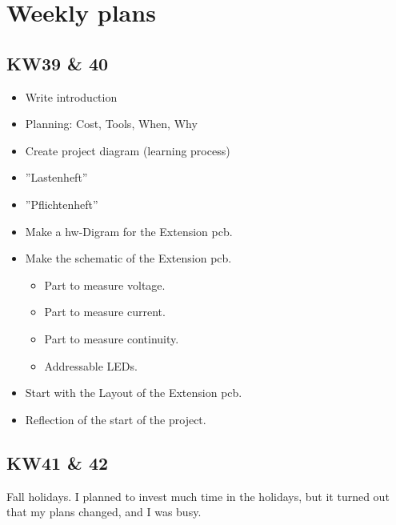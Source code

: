 \newpage



\section{Weekly plans}
\label{sec:Project Planning}

\subsection{KW39 \& 40}
\begin{itemize}
    \item Write introduction
    \item Planning: Cost, Tools, When, Why
    \item Create project diagram (learning process)
    \item ''Lastenheft''
    \item ''Pflichtenheft''
    \item Make a \acs{hw}-Digram for the Extension \acs{pcb}.
    \item Make the schematic of the Extension \acs{pcb}. 
    \begin{itemize}
        \item Part to measure voltage.
        \item Part to measure current.
        \item Part to measure continuity.
        \item Addressable LEDs.
    \end{itemize}
    \item Start with the Layout of the Extension \acs{pcb}.
    \item Reflection of the start of the project.
\end{itemize}




\subsection{KW41 \& 42}
Fall holidays. I planned to invest much time in the holidays, but it turned out that my plans changed, and I was busy.



